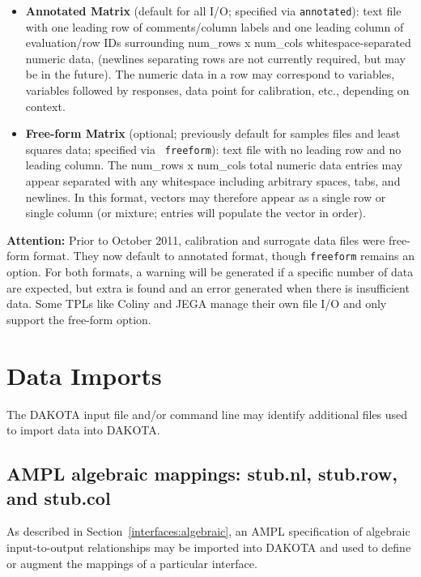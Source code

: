 \begin{itemize}
  \item {\bf Annotated Matrix} (default for all I/O; specified via
    {\tt annotated}): text file with one leading row of comments/column
    labels and one leading column of evaluation/row IDs surrounding
    num\_rows x num\_cols whitespace-separated numeric data, (newlines
    separating rows are not currently required, but may be in the
    future).  The numeric data in a row may correspond to variables,
    variables followed by responses, data point for calibration, etc.,
    depending on context.

   \item {\bf Free-form Matrix} (optional; previously default for
     samples files and least squares data; specified via {\tt
       freeform}): text file with no leading row and no leading
     column.  The num\_rows x num\_cols total numeric data entries may
     appear separated with any whitespace including arbitrary spaces,
     tabs, and newlines.  In this format, vectors may therefore appear
     as a single row or single column (or mixture; entries will
     populate the vector in order).
\end{itemize}

{\bf Attention:} Prior to October 2011, calibration and surrogate data
files were free-form format.  They now default to annotated format,
though {\tt freeform} remains an option.  For both formats, a warning
will be generated if a specific number of data are expected, but extra
is found and an error generated when there is insufficient data.  Some
TPLs like Coliny and JEGA manage their own file I/O and only support
the free-form option.

\section{Data Imports}\label{input:import}

The DAKOTA input file and/or command line may identify additional
files used to import data into DAKOTA.

\subsection{AMPL algebraic mappings: stub.nl, stub.row, and stub.col}

As described in Section~\ref{interfaces:algebraic}, an AMPL
specification of algebraic input-to-output relationships may be
imported into DAKOTA and used to define or augment the mappings of a
particular interface.

